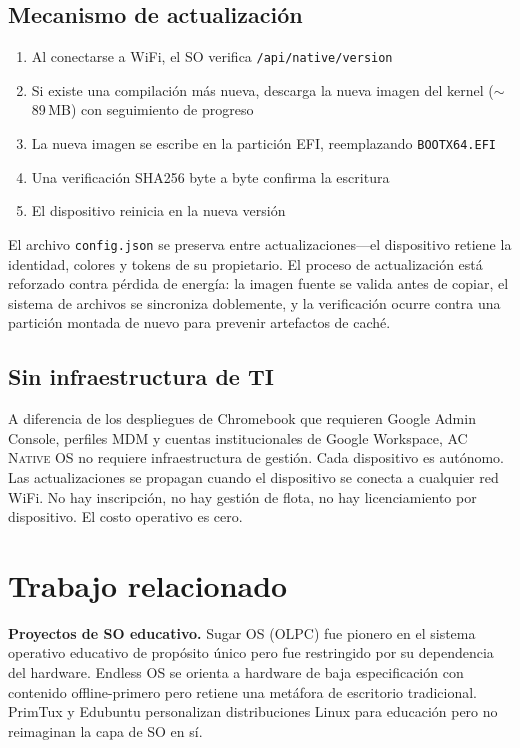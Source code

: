 \documentclass[10pt,letterpaper,twocolumn]{article}
\newcommand{\acos}{\textsc{AC Native OS}}
\begin{document}
\subsection{Mecanismo de actualización}

\begin{enumerate}
  \item Al conectarse a WiFi, el SO verifica \texttt{/api/native/version}
  \item Si existe una compilación más nueva, descarga la nueva imagen del kernel ($\sim$89\,MB) con seguimiento de progreso
  \item La nueva imagen se escribe en la partición EFI, reemplazando \texttt{BOOTX64.EFI}
  \item Una verificación SHA256 byte a byte confirma la escritura
  \item El dispositivo reinicia en la nueva versión
\end{enumerate}

El archivo \texttt{config.json} se preserva entre actualizaciones---el dispositivo retiene la identidad, colores y tokens de su propietario. El proceso de actualización está reforzado contra pérdida de energía: la imagen fuente se valida antes de copiar, el sistema de archivos se sincroniza doblemente, y la verificación ocurre contra una partición montada de nuevo para prevenir artefactos de caché.

\subsection{Sin infraestructura de TI}

A diferencia de los despliegues de Chromebook que requieren Google Admin Console, perfiles MDM y cuentas institucionales de Google Workspace, \acos{} no requiere infraestructura de gestión. Cada dispositivo es autónomo. Las actualizaciones se propagan cuando el dispositivo se conecta a cualquier red WiFi. No hay inscripción, no hay gestión de flota, no hay licenciamiento por dispositivo. El costo operativo es cero.

\section{Trabajo relacionado}
\label{sec:related}

\textbf{Proyectos de SO educativo.} Sugar OS (OLPC) fue pionero en el sistema operativo educativo de propósito único pero fue restringido por su dependencia del hardware. Endless OS se orienta a hardware de baja especificación con contenido offline-primero pero retiene una metáfora de escritorio tradicional. PrimTux y Edubuntu personalizan distribuciones Linux para educación pero no reimaginan la capa de SO en sí.
\end{document}
